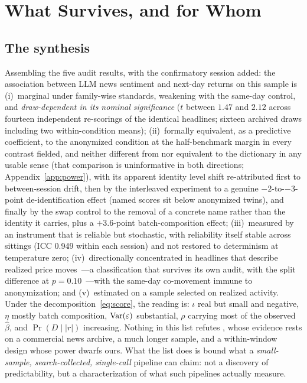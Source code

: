 \section{What Survives, and for Whom}\label{sec:discussion}

\subsection{The synthesis}

Assembling the five audit results, with the confirmatory session added: the association between LLM news sentiment and next-day returns on this sample is (i)~marginal under family-wise standards, weakening with the same-day control, and \emph{draw-dependent in its nominal significance} ($t$ between $1.47$ and $2.12$ across fourteen independent re-scorings of the identical headlines; sixteen archived draws including two within-condition means); (ii)~formally equivalent, as a predictive coefficient, to the anonymized condition at the half-benchmark margin in every contrast fielded, and neither different from nor equivalent to the dictionary in any usable sense (that comparison is uninformative in both directions; Appendix~\ref{app:power}), with its apparent identity level shift re-attributed first to between-session drift, then by the interleaved experiment to a genuine $-2$-to-$-3$-point de-identification effect (named scores sit below anonymized twins), and finally by the swap control to the removal of a concrete name rather than the identity it carries, plus a $+3.6$-point batch-composition effect; (iii)~measured by an instrument that is reliable but stochastic, with reliability itself stable across sittings (ICC 0.949 within each session) and not restored to determinism at temperature zero; (iv)~directionally concentrated in headlines that describe realized price moves~---a classification that survives its own audit, with the split difference at $p=0.10$~---with the same-day co-movement immune to anonymization; and (v)~estimated on a sample selected on realized activity. Under the decomposition~\eqref{eq:score}, the reading is: $\iota$ real but small and negative, $\eta$ mostly batch composition, $\mathrm{Var}(\varepsilon)$ substantial, $\rho$ carrying most of the observed $\hat\beta$, and $\Pr(D\mid |r|)$ increasing. Nothing in this list refutes \citet{lopezlira2026}, whose evidence rests on a commercial news archive, a much longer sample, and a within-window design whose power dwarfs ours. What the list does is bound what a \emph{small-sample, search-collected, single-call} pipeline can claim: not a discovery of predictability, but a characterization of what such pipelines actually measure.

